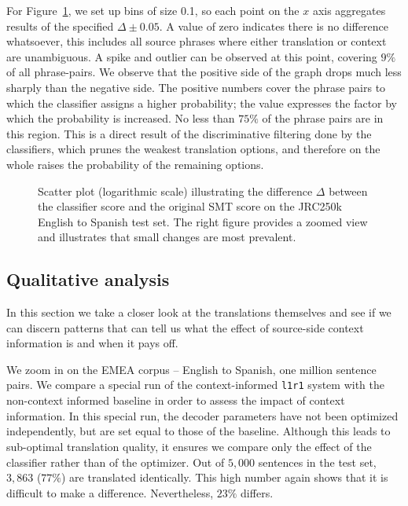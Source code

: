 For Figure~\ref{fig:scoredifference}, we set up bins of size 0.1, so each point
on the $x$ axis aggregates results of the specified $\Delta \pm 0.05$. A
value of zero indicates there is no difference whatsoever, this includes all
source phrases where either translation or context are unambiguous. A spike and
outlier can be observed at this point, covering $9\%$ of
all phrase-pairs. We observe that the positive side of the graph drops much
less sharply than the negative side. The positive numbers cover the phrase
pairs to which the classifier assigns a higher probability; the value expresses
the factor by which the probability is increased. No less than $75\%$ of the
phrase pairs are in this region. This is a direct result of the discriminative
filtering done by the classifiers, which prunes the weakest translation
options, and therefore on the whole raises the probability of the remaining
options.

\begin{figure}
\begin{center}
\setlength\figureheight{6cm}
\setlength\figurewidth{6cm}


\caption{Scatter plot (logarithmic scale) illustrating the difference $\Delta$ between the classifier score and the original SMT score on the JRC250k English to Spanish test set. The right figure provides a zoomed view and illustrates that small changes are most prevalent.}
\label{fig:scoredifference}
\end{center}
\end{figure}


\subsection{Qualitative analysis}
\label{sec:qualanal}

In this section we take a closer look at the translations themselves and see if
we can discern patterns that can tell us what the effect of source-side context
information is and when it pays off.

We zoom in on the EMEA corpus -- English to Spanish, one million sentence
pairs. We compare a special run of the context-informed \texttt{l1r1} system
with the non-context informed baseline in order to assess the impact of context
information. In this special run, the decoder parameters have not been
optimized independently, but are set equal to those of the baseline. Although
this leads to sub-optimal translation quality, it ensures we compare only the
effect of the classifier rather than of the optimizer. Out of $5,000$ sentences
in the test set, $3,863$ ($77\%$) are translated identically. This high number
again shows that it is difficult to make a difference. Nevertheless, $23\%$
differs.

